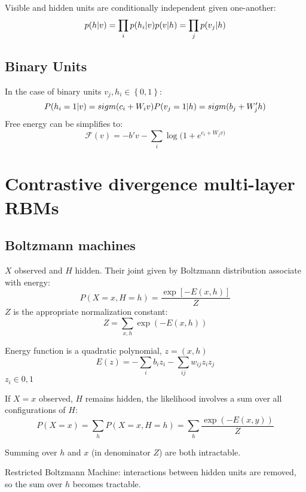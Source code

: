 Visible and hidden units are conditionally independent given one-another:
\begin{equation*}
    p(h|v) = \prod_{i}p(h_i|v) \\
    p(v|h) = \prod_j p(v_j|h)
\end{equation*}

\subsection{Binary Units}
In the case of binary units $v_j, h_i \in \left\{ 0, 1 \right\}$:
\begin{equation*}
    P(h_i = 1| v) = sigm(c_i + W_i v)\\
    P(v_j = 1|h) = sigm(b_j + W'_j h)
\end{equation*}
Free energy can be simplifies to:
\[ \mathcal{F}(v) = - b'v - \sum_i \log(1 + e^{c_i + W_j v)}\]

\section{Contrastive divergence multi-layer RBMs}
\subsection{Boltzmann machines}
$X$ observed and $H$ hidden. Their joint given by Boltzmann distribution
associate with energy:
\[ P(X = x, H= h) = \frac{\exp{[-E(x,h)]}}{Z} \]
$Z$ is the appropriate normalization constant:
\[ Z = \sum_{x,h}\exp{(-E(x,h))}\]

Energy function is a quadratic polynomial, $z=(x,h)$
\[ E(z) = -\sum_i b_i z_i - \sum_{ij}w_{ij}z_i z_j\]
$z_i \in {0, 1}$

If $X = x$ observed, $H$ remains hidden, the likelihood involves a sum
over all configurations of $H$:
\[ P(X = x) = \sum_h P(X = x, H = h) = \sum_h
    \frac{\exp{(-E(x,y))}}{Z}
\]

Summing over $h$ and $x$ (in denominator $Z$) are both
intractable.

Restricted Boltzmann Machine: interactions between hidden units are
removed, so the sum over $h$ becomes tractable.

